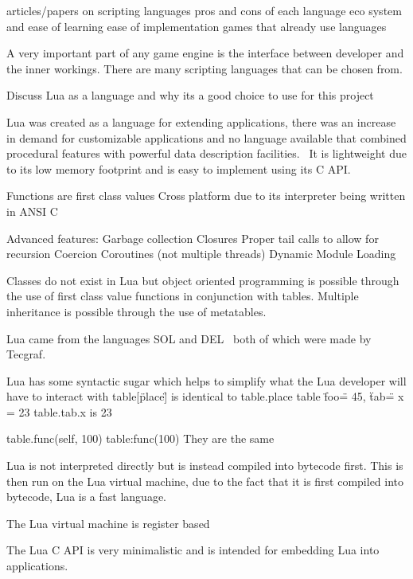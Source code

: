 \documentclass[11pt,a4paper,titlepage]{article}
\begin{document}
		articles/papers on scripting languages
		pros and cons of each language
			eco system and ease of learning
			ease of implementation
		games that already use languages
		
		A very important part of any game engine is the interface between developer and the inner workings. There are many scripting languages that can be chosen from.
		
		\newpage
		Discuss Lua as a language and why its a good choice to use for this project

		Lua was created as a language for extending applications, there was an increase in demand for customizable applications and no language available that combined procedural features with powerful data description facilities.~\cite{Ierusalimschy02software} It is lightweight due to its low memory footprint and is easy to implement using its C API.

		Functions are first class values
		Cross platform due to its interpreter being written in ANSI C

		Advanced features:
		Garbage collection
		Closures
		Proper tail calls to allow for recursion
		Coercion
		Coroutines (not multiple threads)
		Dynamic Module Loading

		Classes do not exist in Lua but object oriented programming is possible through the use of first class value functions in conjunction with tables. Multiple inheritance is possible through the use of metatables.
		
		Lua came from the languages SOL and DEL~\cite{Ierusalimschy01theevolution} both of which were made by Tecgraf.

		Lua has some syntactic sugar which helps to simplify what the Lua developer will have to interact with
		table[\"place\"] is identical to table.place
		table {
			\"foo\" = 45,
			\"tab\" = {
				x = 23
			}
		}
		table.tab.x is 23

		table.func(self, 100)
		table:func(100)
		They are the same

		Lua is not interpreted directly but is instead compiled into bytecode first. This is then run on the Lua virtual machine, due to the fact that it is first compiled into bytecode, Lua is a fast language.

		The Lua virtual machine is register based

		The Lua C API is very minimalistic and is intended for embedding Lua into applications.
\end{document}
